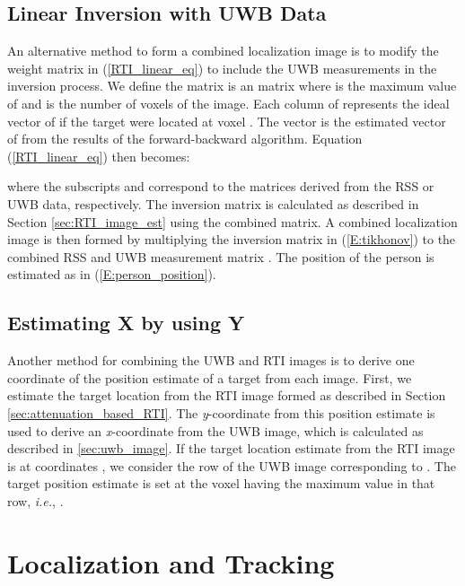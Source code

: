 \documentclass[conference]{IEEEtran}
\begin{document}
\subsection{Linear Inversion with UWB Data} \label{sec:uwb_inversion}

An alternative method to form a combined localization image is to
modify the weight  matrix in (\ref{RTI_linear_eq}) to include the
UWB measurements in the inversion process. We define the matrix
 is an  matrix where  is the maximum
value of  and  is the number of voxels of the image. Each column
of  represents the ideal vector of  if the
target were located at voxel . The vector  is the estimated
vector of  from the results of the forward-backward
algorithm. Equation (\ref{RTI_linear_eq}) then becomes:

where the subscripts  and  correspond to the matrices derived
from the RSS or UWB data, respectively. The inversion matrix is
calculated as described in Section \ref{sec:RTI_image_est} using the
combined  matrix. A combined localization image  is
then formed by multiplying the inversion matrix in (\ref{E:tikhonov})
to the combined RSS and UWB measurement matrix . The
position of the person is estimated as in (\ref{E:person_position}).



\subsection{Estimating X by using Y} \label{sec:x_from_y}

Another method for combining the UWB and RTI images is to derive one
coordinate of the position estimate of a target from each
image. First, we estimate the target location from the RTI image
formed as described in Section \ref{sec:attenuation_based_RTI}. The
\emph{y}-coordinate from this position estimate is used to derive an
\emph{x}-coordinate from the UWB image, which is calculated as
described in \ref{sec:uwb_image}. If the target location estimate from
the RTI image is at coordinates , we consider
the row of the UWB image corresponding to . The target
position estimate  is set at the voxel having the maximum
value in that row, \emph{i.e.}, .





\section{Localization and Tracking} \label{sec:gating}
\end{document}
